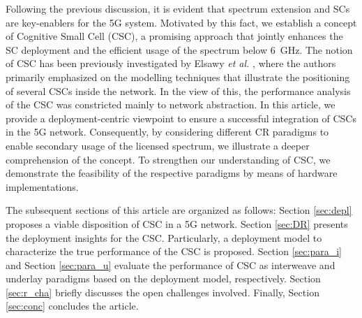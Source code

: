 \documentclass[draftcls, onecolumn, 11pt]{IEEEtran}
\begin{document}
Following the previous discussion, it is evident that spectrum extension and SCs are key-enablers for the 5G system. 
Motivated by this fact, we establish a concept of Cognitive Small Cell (CSC), a promising approach that jointly enhances the SC deployment and the efficient usage of the spectrum below \SI{6}{GHz}. The notion of CSC has been previously investigated by Elsawy \textit{et al.} \cite{Elsawy13}, where the authors primarily emphasized on the modelling techniques that illustrate the positioning of several CSCs inside the network. In the view of this, the performance analysis of the CSC was constricted mainly to network abstraction. In this article, we provide a deployment-centric viewpoint to ensure a successful integration of CSCs in the 5G network. Consequently, by considering different CR paradigms to enable secondary usage of the licensed spectrum, we illustrate a deeper comprehension of the concept. %
To strengthen our understanding of CSC, we demonstrate the feasibility of the respective paradigms by means of hardware implementations.

The subsequent sections of this article are organized as follows: Section \ref{sec:depl} proposes a viable disposition of CSC in a 5G network. Section \ref{sec:DR} presents the deployment insights for the CSC. Particularly, a deployment model to characterize the true performance of the CSC is proposed. Section \ref{sec:para_i} and Section \ref{sec:para_u} evaluate the performance of CSC as interweave and underlay paradigms based on the deployment model, respectively. Section \ref{sec:r_cha} briefly discusses the open challenges involved. Finally, Section \ref{sec:conc} concludes the article. 
   
\end{document}
